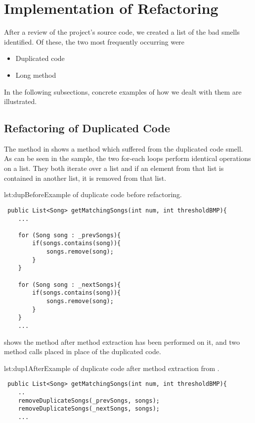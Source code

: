 \section{Implementation of Refactoring}
After a review of the project's source code, we created a list of the bad smells identified. Of these, the two most frequently occurring were
\begin{itemize}
\item Duplicated code
\item Long method
\end{itemize}

In the following subsections, concrete examples of how we dealt with them are illustrated. 
\subsection{Refactoring of Duplicated Code}
The method in  shows a method which suffered from the duplicated code smell. As can be seen in the sample, the two for-each loops perform identical operations on a list. They both iterate over a list and if an element from that list is contained in another list, it is removed from that list.

\begin{code}{lst:dupBefore}{Example of duplicate code before refactoring.}
\begin{lstlisting}
 public List<Song> getMatchingSongs(int num, int thresholdBMP){
    ...

    for (Song song : _prevSongs){
        if(songs.contains(song)){
            songs.remove(song);
        }
    }

    for (Song song : _nextSongs){
        if(songs.contains(song)){
            songs.remove(song);
        }
    }
    ...
\end{lstlisting}
\end{code}

 shows the method after method extraction has been performed on it, and two method calls placed in place of the duplicated code.

\begin{code}{lst:dup1After}{Example of duplicate code after method extraction from .}
\begin{lstlisting}
 public List<Song> getMatchingSongs(int num, int thresholdBMP){
    ..
    removeDuplicateSongs(_prevSongs, songs);
    removeDuplicateSongs(_nextSongs, songs);
    ...
\end{lstlisting}
\end{code}

